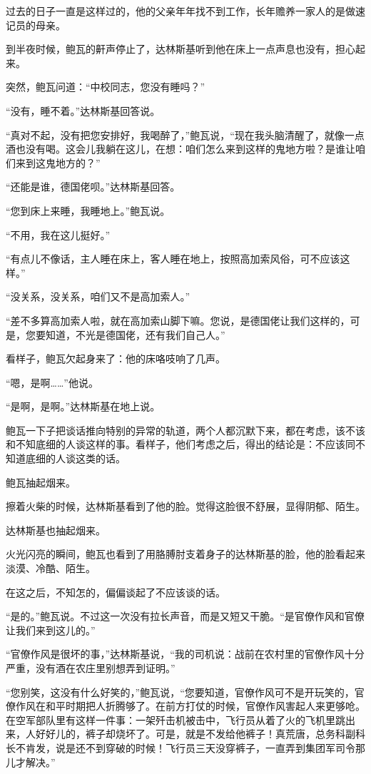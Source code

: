 过去的日子一直是这样过的，他的父亲年年找不到工作，长年赡养一家人的是做速记员的母亲。

到半夜时候，鲍瓦的鼾声停止了，达林斯基听到他在床上一点声息也没有，担心起来。

突然，鲍瓦问道：“中校同志，您没有睡吗？”

“没有，睡不着。”达林斯基回答说。

“真对不起，没有把您安排好，我喝醉了，”鲍瓦说，“现在我头脑清醒了，就像一点酒也没有喝。这会儿我躺在这儿，在想：咱们怎么来到这样的鬼地方啦？是谁让咱们来到这鬼地方的？”

“还能是谁，德国佬呗。”达林斯基回答。

“您到床上来睡，我睡地上。”鲍瓦说。

“不用，我在这儿挺好。”

“有点儿不像话，主人睡在床上，客人睡在地上，按照高加索风俗，可不应该这样。”

“没关系，没关系，咱们又不是高加索人。”

“差不多算高加索人啦，就在高加索山脚下嘛。您说，是德国佬让我们这样的，可是，您要知道，不光是德国佬，还有我们自己人。”

看样子，鲍瓦欠起身来了：他的床咯吱响了几声。

“嗯，是啊……”他说。

“是啊，是啊。”达林斯基在地上说。

鲍瓦一下子把谈话推向特别的异常的轨道，两个人都沉默下来，都在考虑，该不该和不知底细的人谈这样的事。看样子，他们考虑之后，得出的结论是：不应该同不知道底细的人谈这类的话。

鲍瓦抽起烟来。

擦着火柴的时候，达林斯基看到了他的脸。觉得这脸很不舒展，显得阴郁、陌生。

达林斯基也抽起烟来。

火光闪亮的瞬间，鲍瓦也看到了用胳膊肘支着身子的达林斯基的脸，他的脸看起来淡漠、冷酷、陌生。

在这之后，不知怎的，偏偏谈起了不应该谈的话。

“是的。”鲍瓦说。不过这一次没有拉长声音，而是又短又干脆。“是官僚作风和官僚让我们来到这儿的。”

“官僚作风是很坏的事，”达林斯基说，“我的司机说：战前在农村里的官僚作风十分严重，没有酒在农庄里别想弄到证明。”

“您别笑，这没有什么好笑的，”鲍瓦说，“您要知道，官僚作风可不是开玩笑的，官僚作风在和平时期把人折腾够了。在前方打仗的时候，官僚作风害起人来更够呛。在空军部队里有这样一件事：一架歼击机被击中，飞行员从着了火的飞机里跳出来，人好好儿的，裤子却烧坏了。可是，就是不发给他裤子！真荒唐，总务科副科长不肯发，说是还不到穿破的时候！飞行员三天没穿裤子，一直弄到集团军司令那儿才解决。”

